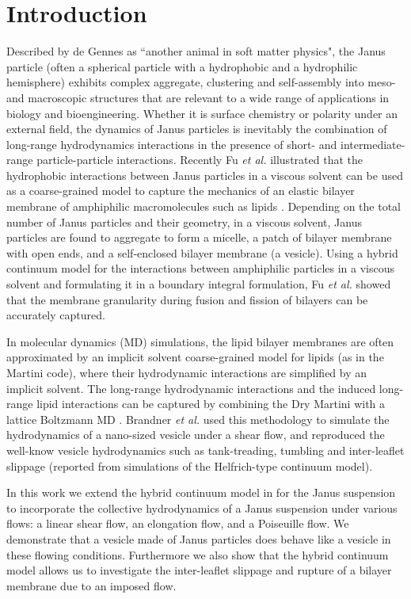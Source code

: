 \documentclass[lineno]{jfm}
\begin{document}
\section{\label{intro}Introduction}
Described by de Gennes as ``another animal in soft matter physics", the Janus particle (often a spherical particle with a hydrophobic and a hydrophilic hemisphere) exhibits complex aggregate, clustering and self-assembly into meso- and macroscopic structures that are relevant to a wide range of applications in biology and bioengineering. Whether it is surface chemistry or polarity under an external field, the dynamics of Janus particles is inevitably the combination of long-range hydrodynamics interactions in the presence of short- and intermediate-range particle-particle interactions. 
Recently Fu {\it et al.} illustrated that the hydrophobic interactions between Janus particles in a viscous solvent can be used as a coarse-grained model to capture the mechanics of an elastic bilayer membrane of amphiphilic macromolecules such as lipids \cite{Fu20}. Depending on the total number of Janus particles and their geometry, in a viscous solvent, Janus particles are found to aggregate to form a micelle, a patch of bilayer membrane with open ends, and a self-enclosed bilayer membrane (a vesicle). Using a hybrid continuum model for the interactions between amphiphilic particles in a viscous solvent and formulating it in a boundary integral formulation, Fu {\it et al.} showed that the membrane granularity during fusion and fission of bilayers can be accurately captured. 

In molecular dynamics (MD) simulations, the lipid bilayer membranes are often approximated by an implicit solvent coarse-grained model for lipids (as in the Martini code), where their hydrodynamic interactions are simplified by an implicit solvent. The long-range hydrodynamic interactions and the induced long-range lipid interactions can be captured by combining the Dry Martini with a lattice Boltzmann MD \cite{Brandner2019}. Brandner {\it et al.} used this methodology to simulate the hydrodynamics of a nano-sized vesicle under a shear flow, and reproduced the well-know vesicle hydrodynamics  such as tank-treading, tumbling and inter-leaflet slippage (reported from simulations of the Helfrich-type continuum model).

In this work we extend the hybrid continuum model in \cite{Fu20} for the Janus suspension to incorporate the collective hydrodynamics of a Janus suspension under various flows: a linear shear flow, an elongation flow, and a Poiseuille flow. We demonstrate that a vesicle made of Janus particles does behave like a vesicle in these flowing conditions. Furthermore we also show that the hybrid continuum model allows us to investigate the inter-leaflet slippage and rupture of a bilayer membrane due to an imposed flow.
\end{document}
